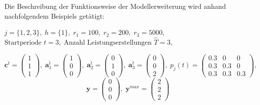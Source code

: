 Die Beschreibung der Funktionsweise der Modellerweiterung wird anhand nachfolgendem Beispiels getätigt:

\begin{center}
$j = \{1, 2, 3\}, \; h = \{1\}, \; r_{1} = 100, \; r_{2} = 200, \; r_{3} = 5000,$ \\
$\text{Startperiode } t=3, \; \text{Anzahl Leistungserstellungen } \hat{T}= 3$,
\end{center}
\[
    \textbf{c}^{\hat{t}}=\begin{pmatrix} 1\\ 1\\ 1  \end{pmatrix}, \;
    \textbf{a}^{\hat t}_{1}=\begin{pmatrix} 1\\ 0\\ 0  \end{pmatrix}, \;
     \textbf{a}^{\hat t}_{2}=\begin{pmatrix} 0\\ 1\\ 0  \end{pmatrix}, \;
       \textbf{a}^{\hat t}_{3}=\begin{pmatrix} 0\\ 0\\ 2  \end{pmatrix}, \;
            p_{j}(t)=
       \begin{pmatrix}
       0.3 & 0 & 0 \\
0.3 & 0.3 & 0 \\
0.3 & 0.3 & 0.3
\end{pmatrix}, 
  \]
  \[
    \textbf{y}= \begin{pmatrix} 0\\ 0\\ 0  \end{pmatrix}, \;
    \textbf{y}^{max}=\begin{pmatrix} 2\\ 2\\ 2  \end{pmatrix}
      \]\\[0.5cm]


